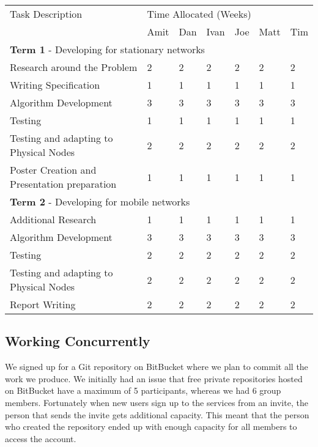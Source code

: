 \begin{table}[H]
	\centering
	\begin{tabular}{| l | l | l | l | l | l | l |}
	Task Description & \multicolumn{6}{|l|}{Time Allocated (Weeks)}\\
	~ & Amit & Dan & Ivan & Joe & Matt & Tim \\
	\hline
	\hline
	\multicolumn{7}{|l|}{\textbf{Term 1} - Developing for stationary networks} \\
	\hline

	Research around the Problem & 2 & 2 & 2 & 2 & 2 & 2\\
	Writing Specification & 1 & 1 & 1 & 1 & 1 & 1\\
	Algorithm Development & 3 & 3 & 3 & 3 & 3 & 3\\
	Testing & 1 & 1 & 1 & 1 & 1 & 1\\
	Testing and adapting to Physical Nodes & 2 & 2 & 2 & 2 & 2 & 2\\
	Poster Creation and Presentation preparation & 1 & 1 & 1 & 1 & 1 & 1\\

	\hline
	\hline
	\multicolumn{7}{|l|}{\textbf{Term 2} - Developing for mobile networks} \\
	\hline
	
	Additional Research & 1 & 1 & 1 & 1 & 1 & 1\\
	Algorithm Development & 3 & 3 & 3 & 3 & 3 & 3\\
	Testing & 2 & 2 & 2 & 2 & 2 & 2\\
	Testing and adapting to Physical Nodes & 2 & 2 & 2 & 2 & 2 & 2\\
	Report Writing & 2 & 2 & 2 & 2 & 2 & 2\\
	
	\hline
	
	\end{tabular}
\end{table}



\subsection{Working Concurrently}

We signed up for a Git repository on BitBucket \cite{?} where we plan to commit all the work we produce. We initially had an issue that free private repositories hosted on BitBucket have a maximum of 5 participants, whereas we had 6 group members. Fortunately when new users sign up to the services from an invite, the person that sends the invite gets additional capacity. This meant that the person who created the repository ended up with enough capacity for all members to access the account.

